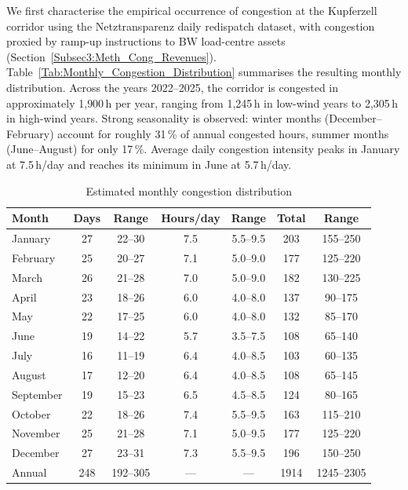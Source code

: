 We first characterise the empirical occurrence of congestion at the Kupferzell corridor using the Netztransparenz daily redispatch dataset, with congestion proxied by ramp-up instructions to BW load-centre assets (Section~\ref{Subsec3:Meth_Cong_Revenues}). Table~\ref{Tab:Monthly_Congestion_Distribution} summarises the resulting monthly distribution. Across the years 2022--2025, the corridor is congested in approximately 1{,}900\,h per year, ranging from 1{,}245\,h in low-wind years to 2{,}305\,h in high-wind years. Strong seasonality is observed: winter months (December--February) account for roughly 31\,\% of annual congested hours, summer months (June--August) for only 17\,\%. Average daily congestion intensity peaks in January at 7.5\,h/day and reaches its minimum in June at 5.7\,h/day.
\begin{table}[htbp]
\centering
\caption{Estimated monthly congestion distribution}
\label{tab:monthly}
\begin{tabular}{lcccccc}
\hline
Month & Days & Range & Hours/day & Range & Total & Range \\
\hline
January   & 27 & 22--30 & 7.5 & 5.5--9.5 & 203 & 155--250 \\
February  & 25 & 20--27 & 7.1 & 5.0--9.0 & 177 & 125--220 \\
March     & 26 & 21--28 & 7.0 & 5.0--9.0 & 182 & 130--225 \\
April     & 23 & 18--26 & 6.0 & 4.0--8.0 & 137 & 90--175 \\
May       & 22 & 17--25 & 6.0 & 4.0--8.0 & 132 & 85--170 \\
June      & 19 & 14--22 & 5.7 & 3.5--7.5 & 108 & 65--140 \\
July      & 16 & 11--19 & 6.4 & 4.0--8.5 & 103 & 60--135 \\
August    & 17 & 12--20 & 6.4 & 4.0--8.5 & 108 & 65--145 \\
September & 19 & 15--23 & 6.5 & 4.5--8.5 & 124 & 80--165 \\
October   & 22 & 18--26 & 7.4 & 5.5--9.5 & 163 & 115--210 \\
November  & 25 & 21--28 & 7.1 & 5.0--9.5 & 177 & 125--220 \\
December  & 27 & 23--31 & 7.3 & 5.5--9.5 & 196 & 150--250 \\
\hline
Annual & 248 & 192--305 & --- & --- & 1914 & 1245--2305 \\
\hline
\end{tabular}
\end{table}

